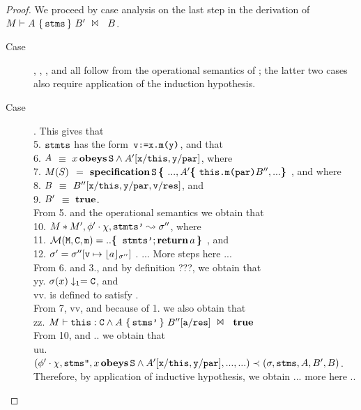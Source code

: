 \begin{proof}
We proceed by case analysis on the last step in the derivation of $\HoareExpl     {\A} {\prg{stms}}{\M}  {\B'} {\B}$.
\begin{description}
%
\item[Case] , , ,  and  all
 follow %
 from the operational semantics of \LangOO; the latter two cases also require application of the induction hypothesis. \item[Case] .
 {This gives that \\
 5. $\prg{stmts}$ has the form\ $ \prg{v:=x.m(y)}$, and that \\
 6. $\A$ $\equiv$
 $x \obeys \prg{S} \wedge \A'[\prg{x}/\prg{this}, \prg{y}/\prg{par}]$, where \\
 7.   $\M(S)$ $=$ $\kw{specification}\, \prg{S}\, \lb ..., \A' \lb \prg{this.m(par)} \B'', ... \rb$, and where\\
8. $\B$ $\equiv$
  $ \B''[\prg{x}/\prg{this}, \prg{y}/\prg{par}, \prg{v}/\prg{res}]$, and\\
 9.  $\B'$ $\equiv$ $\kw{true}$. \\
From 5. and the operational semantics we obtain that \\
10. $\M*\M', \phi'\cdot\chi, \prg{stmts'} \leadsto \sigma''$, where  \\
11. $\Meths {} {\prg{C}} {\prg{m}} = .. \lb\, \prg{stmts'}; \kw{return}\, a\, \rb $,   and\\
 12. $\sigma'=\sigma''[\prg{v} \mapsto \interp {a} {\sigma''}]$ .
... More steps here ...\\
From 6. and 3., and by definition ???, we obtain that\\
yy. $\sigma(x)\downarrow_1=\prg{C}$, and \\
vv.  is defined to satisfy .\\
From 7, vv, and because of 1. we also obtain that\\
zz. $\HoareExpl     {\prg{this}:\prg{C} \wedge \A} {\prg{stms'}}{\M}  {\B''[\prg{a}/\prg{res}]} {\kw{true}}$\\
From 10, and .. we obtain that\\
uu. $(\phi'\cdot\chi,\prg{stms''}, x \obeys \prg{S} \wedge \A'[\prg{x}/\prg{this}, \prg{y}/\prg{par}], ..., ...)
 \prec (\sigma, {\prg{stms}}, {\A}, {\B'},{\B}) $.\\
Therefore, by application of inductive hypothesis, we obtain
... more here ..}


\end{description}
\end{proof}
